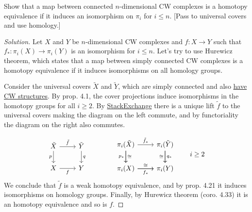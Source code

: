 \documentclass{article}
\numberwithin{equation}{section}
\begin{document}
\begin{exercise}[4.2.13]
	Show that a map between connected $n$-dimensional CW complexes is a homotopy equivalence if it induces an isomorphism on $\pi_i$ for $i\leq n$. [Pass to universal covers and use homology.]
\end{exercise}
\begin{proof}[Solution]
	Let $X$ and $Y$ be $n$-dimensional CW complexes and $f:X\to Y$ such that $f_*:\pi_i(X)\to\pi_i(Y)$ is an isomorphism for $i\leq n$. Let's try to use Hurewicz theorem, which states that a map between simply connected CW complexes is a homotopy equivalence if it induces isomorphisms on all homology groups.
	
	Consider the universal covers $\tilde{X}$ and $\tilde{Y}$, which are simply connected and also \href{https://math.stackexchange.com/questions/1148411/universal-covering-space-of-cw-complex-has-cw-complex-structure/1148918#1148918}{have CW structures}. By prop. 4.1, the cover projections induce isomorphisms in the homotopy groups for all $i\geq2$. By \href{https://math.stackexchange.com/questions/2206906/unique-map-of-universal-covering-space}{StackExchange} there is a unique lift $\tilde{f}$ to the universal covers making the diagram on the left commute, and by functoriality the diagram on the right also commutes.
	
	
	
	\[\begin{tikzcd}
		\tilde{X}\arrow[d,swap,"p"]\arrow[r,"\tilde{f}"]&\tilde{Y}\arrow[d,"q"]\\
		X\arrow[r,"f",swap]&Y
	\end{tikzcd}\qquad\qquad
	\begin{tikzcd}
		\pi_i(\tilde{X})\arrow[r,"\tilde{f}_*"]\arrow[d,swap,"p_*"]\arrow[d,"\cong"]&\pi_i(\tilde{Y})\arrow[d,"q_*"]\arrow[d,swap,"\cong"]\\
		\pi_i(X)\arrow[r,"f_*",swap]\arrow[r,"\cong"]&\pi_i(Y)
	\end{tikzcd}\qquad i\geq2\]
	We conclude that $\tilde{f}$ {\color{red}is a weak homotopy equivalence}, and by prop. 4.21 it induces isomorphisms on homology groups. Finally, by Hurewicz theorem (coro. 4.33) it is an homotopy equivalence and so is $f$.
\end{proof}
\end{document}
